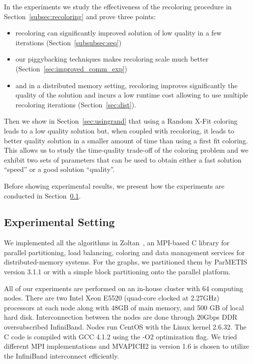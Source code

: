 \documentclass{article}
\begin{document}
In the experiments we study the
effectiveness of the recoloring procedure in
Section~\ref{subsec:recoloring} and prove three points:
\begin{itemize}
\item recoloring can significantly improved solution of low quality in
  a few iterations (Section~\ref{subsubsec:seq})
\item our piggybacking techniques makes recoloring scale much better
  (Section~\ref{sec:improved_comm_exp})
\item and in a distributed memory setting, recoloring improves
  significantly the quality of the solution and incurs a low runtime
  cost allowing to use multiple recoloring iterations
  (Section~\ref{sec:dist}).
\end{itemize}
Then we show in Section~\ref{sec:usingrand} that using a Random X-Fit
coloring leads to a low quality solution but, when coupled with
recoloring, it leads to better quality solution in a smaller amount of
time than using a first fit coloring. This allows us to study the
time-quality trade-off of the coloring problem and we exhibit two sets
of parameters that can be used to obtain either a fast solution
``speed'' or a good solution ``quality''.

Before showing experimental results, we present how the experiments are
conducted in Section~\ref{sec:expesetting}.

\subsection{Experimental Setting}
\label{sec:expesetting}

We implemented all the algorithms in Zoltan~\cite{zoltanug_v3}, an
MPI-based C library for parallel partitioning, load balancing,
coloring and data management services for distributed-memory systems.
For the graphs, we partitioned them by ParMETIS~\cite{parmetis31} version 3.1.1 or with
a simple block partitioning onto the parallel platform.

All of our experiments are performed on an in-house cluster with
64 computing nodes. There are two Intel Xeon
E5520 (quad-core clocked at 2.27GHz) processors at each node along with
48GB of main memory, and 500
GB of local hard disk. Interconnection between the nodes are done through 20Gbps DDR
oversubscribed InfiniBand. Nodes run CentOS with the Linux kernel
2.6.32. The C code is compiled with GCC 4.1.2 using the -O2
optimization flag. We tried different MPI implementations and
MVAPICH2 in version 1.6 is chosen to utilize
the InfiniBand interconnect efficiently.
\end{document}
